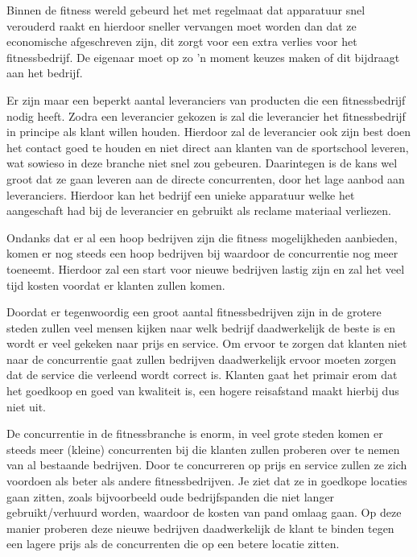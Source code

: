Binnen de fitness wereld gebeurd het met regelmaat dat apparatuur snel verouderd raakt en hierdoor sneller vervangen moet worden dan dat ze economische afgeschreven zijn, dit zorgt voor een extra verlies voor het fitnessbedrijf. De eigenaar moet op zo 'n moment keuzes maken of dit bijdraagt aan het bedrijf. 

Er zijn maar een beperkt aantal leveranciers van producten die een fitnessbedrijf nodig heeft. Zodra een leverancier gekozen is zal die leverancier het fitnessbedrijf in principe als klant willen houden. Hierdoor zal de leverancier ook zijn best doen het contact goed te houden en niet direct aan klanten van de sportschool leveren, wat sowieso in deze branche niet snel zou gebeuren. Daarintegen is de kans wel groot dat ze gaan leveren aan de directe concurrenten, door het lage aanbod aan leveranciers. Hierdoor kan het bedrijf een unieke apparatuur welke het aangeschaft had bij de leverancier en gebruikt als reclame materiaal verliezen.

Ondanks dat er al een hoop bedrijven zijn die fitness mogelijkheden aanbieden, komen er nog steeds een hoop bedrijven bij waardoor de concurrentie nog meer toeneemt. Hierdoor zal een start voor nieuwe bedrijven lastig zijn en zal het veel tijd kosten voordat er klanten zullen komen.

Doordat er tegenwoordig een groot aantal fitnessbedrijven zijn in de grotere steden zullen veel mensen kijken naar welk bedrijf daadwerkelijk de beste is en wordt er veel gekeken naar prijs en service. Om ervoor te zorgen dat klanten niet naar de concurrentie gaat zullen bedrijven daadwerkelijk ervoor moeten zorgen dat de service die verleend wordt correct is. Klanten gaat het primair erom dat het goedkoop en goed van kwaliteit is, een hogere reisafstand maakt hierbij dus niet uit.

De concurrentie in de fitnessbranche is enorm, in veel grote steden komen er steeds meer (kleine) concurrenten bij die klanten zullen proberen over te nemen van al bestaande bedrijven. Door te concurreren op prijs en service zullen ze zich voordoen als beter als andere fitnessbedrijven. Je ziet dat ze in goedkope locaties gaan zitten, zoals bijvoorbeeld oude bedrijfspanden die niet langer gebruikt/verhuurd worden, waardoor de kosten van pand omlaag gaan. Op deze manier proberen deze nieuwe bedrijven daadwerkelijk de klant te binden tegen een lagere prijs als de concurrenten die op een betere locatie zitten.

